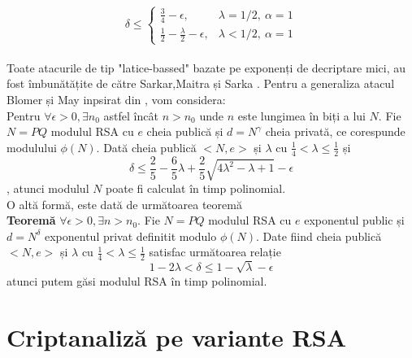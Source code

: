 \documentclass[12pt, oneside]{book}
\begin{document}
\[
\delta \leq
\begin{cases}
\frac{3}{4} -  \epsilon,  &\lambda=1/2 , \ \alpha=1  \\
\frac{1}{2} - \frac{\lambda}{2} - \epsilon,  &\lambda<1/2, \ \alpha=1
\end{cases}
\]
\\
Toate atacurile de tip "latice-bassed" bazate pe exponenți de decriptare mici, au fost îmbunătățite de către Sarkar,Maitra și Sarka \cite{sarkar}. Pentru a generaliza atacul Blomer și May inpsirat din \cite{sarkar}, vom considera: \\
Pentru $\forall \epsilon > 0, \exists n_0$ astfel încât $n>n_0$ unde $n$ este lungimea în biți a lui $N$. Fie $N=PQ$ modulul RSA cu $e$ cheia publică și $d=N^{\gamma}$ cheia privată, ce corespunde modulului $\phi(N)$. Dată cheia publică $<N,e>$ și $\lambda$ cu $\frac{1}{4}<\lambda\leq \frac{1}{2}$ și 
$$ \delta \leq \frac{2}{5} - \frac{6}{5}\lambda + \frac{2}{5} \sqrt{4\lambda^{2}- \lambda +1} - \epsilon $$,
atunci modulul $N$ poate fi calculat în timp polinomial. \\
O altă formă, este dată de următoarea teoremă \\
\textbf{Teoremă} $\forall \epsilon > 0, \exists n >n_0$. Fie $N=PQ$ modulul RSA cu $e$ exponentul public și $d=N^{\delta}$ exponentul privat definitit modulo $\phi(N)$. Date fiind cheia publică $<N,e>$ și $\lambda$ cu $\frac{1}{4} < \lambda \leq \frac{1}{2} $ satisfac următoarea relație
$$ 1- 2\lambda < \delta \leq 1 - \sqrt{\lambda}-\epsilon$$
atunci putem găsi modulul RSA în timp polinomial.
\section{Criptanaliză pe variante RSA}
\end{document}
